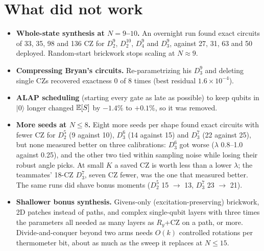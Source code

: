 \documentclass[11pt]{scrartcl}
\newcommand{\ket}[1]{\lvert #1\rangle}
\newcommand{\D}[2]{D^{#1}_{#2}}
\newcommand{\CZ}{\ensuremath{\mathrm{CZ}}}
\begin{document}
\section{What did not work}

\begin{itemize}
  \item \textbf{Whole-state synthesis at $N=9$--$10$.} An overnight run found exact circuits of
        33, 35, 98 and 136 \CZ{} for $\D92$, $\D{10}2$, $\D94$ and $\D93$, against 27, 31, 63 and 50
        deployed. Random-start brickwork stops scaling at $N\approx9$.
  \item \textbf{Compressing Bryan's circuits.} Re-parametrizing his $\D93$ and deleting single
        \CZ{}s recovered exactness 0 of 8 times (best residual $1.6\times10^{-4}$).
  \item \textbf{ALAP scheduling} (starting every gate as late as possible) to keep qubits in $\ket0$
        longer changed $\mathbb E[S]$ by $-1.4\%$ to $+0.1\%$, so it was removed.
  \item \textbf{More seeds at $N\le8$.} Eight more seeds per shape found exact circuits with fewer
        \CZ{} for $\D52$ (9 against 10), $\D63$ (14 against 15) and $\D73$ (22 against 25), but none
        measured better on three calibrations: $\D63$ got worse ($\lambda$ 0.8--1.0 against 0.25),
        and the other two tied within sampling noise while losing their robust angle picks. At
        small $K$ a saved \CZ{} is worth less than a lower $\lambda$; the teammates' 18-\CZ{} $\D73$,
        seven \CZ{} fewer, was the one that measured better. The same runs did shave bonus moments
        ($\D52$ 15 $\to$ 13, $\D73$ 23 $\to$ 21).
  \item \textbf{Shallower bonus synthesis.} Givens-only (excitation-preserving) brickwork, 2D
        patches instead of paths, and complex single-qubit layers with three times the parameters
        all needed as many layers as $R_y$+\CZ{} on a path, or more. Divide-and-conquer beyond two
        arms needs $O(k)$ controlled rotations per thermometer bit, about as much as the sweep it
        replaces at $N\le15$.
\end{itemize}



\end{document}

